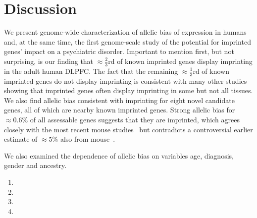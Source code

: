 \documentclass[letterpaper]{article}
\begin{document}
\section{Discussion}

We present  genome-wide characterization of allelic bias of
expression in humans and, at the same time, the first genome-scale study of
the potential for imprinted genes' impact on a psychiatric disorder. Important
to mention first, but not surprising, is our finding that \(\approx
\frac{2}{3}\)rd of known imprinted genes display imprinting in the adult human
DLPFC. The fact that the remaining \(\approx \frac{1}{3}\)rd of known
imprinted genes do not display imprinting is consistent with many other
studies showing that imprinted genes often display imprinting in some but not
all tissues. We also find allelic bias consistent with imprinting for eight
novel candidate genes, all of which are nearby known imprinted genes.  Strong
allelic bias for \(\approx 0.6\%\) of all assessable genes suggests that they
are imprinted, which agrees closely with the most recent mouse
studies~\cite{DeVeale2012,Perez2015} but contradicts a controversial earlier
estimate of \(\approx 5\%\) also from mouse~\cite{Gregg2010a}.

We also examined the dependence of allelic bias on variables  age,
diagnosis, gender and ancestry.
\begin{enumerate}
\item {}
\item {}
\item {}
\item {}
\end{enumerate}
\end{document}
